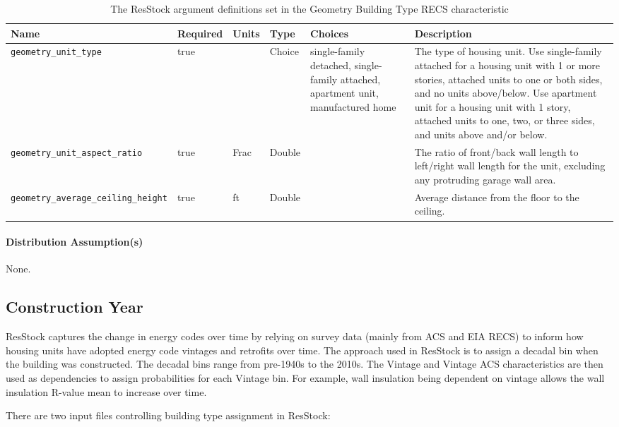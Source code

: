 \begin{longtable}[]{ |p{}|p{1.5cm}|p{1cm}|p{1.1cm}|p{1.4cm}|p{6cm}| }
\caption{The ResStock argument definitions set in the Geometry Building Type RECS characteristic} \label{table:hc_arg_def_gbt_recs}  \\
\toprule\noalign{}
Name & Required & Units & Type & Choices & Description \\
\midrule\noalign{}
\endhead
\bottomrule\noalign{}
\endlastfoot
\texttt{geometry\_unit\_type} & true & & Choice & single-family
detached, single-family attached, apartment unit, manufactured home &
The type of housing unit. Use single-family attached for a housing
unit with 1 or more stories, attached units to one or both sides, and no
units above/below. Use apartment unit for a housing unit with 1 story,
attached units to one, two, or three sides, and units above and/or
below. \\
\hline
\texttt{geometry\_unit\_aspect\_ratio} & true & Frac & Double & & The
ratio of front/back wall length to left/right wall length for the unit,
excluding any protruding garage wall area. \\
\hline
\texttt{geometry\_average\_ceiling\_height} & true & ft & Double & &
Average distance from the floor to the ceiling. \\
\end{longtable}

\paragraph{Distribution Assumption(s)}
None.

\subsection{Construction Year}
ResStock captures the change in energy codes over time by relying on survey data (mainly from ACS and EIA RECS) to inform how housing units have adopted energy code vintages and retrofits over time. The approach used in ResStock is to assign a decadal bin when the building was constructed. The decadal bins range from pre-1940s to the 2010s. The Vintage and Vintage ACS characteristics are then used as dependencies to assign probabilities for each Vintage bin. For example, wall insulation being dependent on vintage allows the wall insulation R-value mean to increase over time.

There are two input files controlling building type assignment in ResStock:

